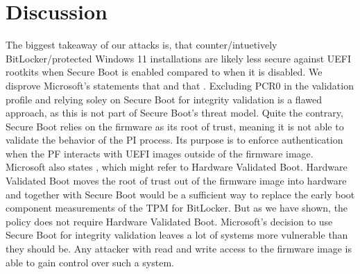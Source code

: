 


\chapter{Discussion}

The biggest takeaway of our attacks is, that counter\-/intuetively BitLocker\-/protected Windows 11 installations are likely less secure against \ac{UEFI} rootkits when Secure Boot is enabled compared to when it is disabled.
We disprove Microsoft's statements that  and that .
Excluding \ac{PCR}0 in the validation profile and relying soley on Secure Boot for integrity validation is a flawed approach, as this is not part of Secure Boot's threat model.
Quite the contrary, Secure Boot relies on the firmware as its root of trust, meaning it is not able to validate the behavior of the \ac{PI} process.
Its purpose is to enforce authentication when the \ac{PF} interacts with \ac{UEFI} images outside of the firmware image.
Microsoft also states , which might refer to Hardware Validated Boot.
Hardware Validated Boot moves the root of trust out of the firmware image into hardware and together with Secure Boot would be a sufficient way to replace the early boot component measurements of the \ac{TPM} for BitLocker.
But as we have shown, the policy does not require Hardware Validated Boot.
Microsoft's decision to use Secure Boot for integrity validation leaves a lot of systems more vulnerable than they should be.
Any attacker with read and write access to the firmware image is able to gain control over such a system.
